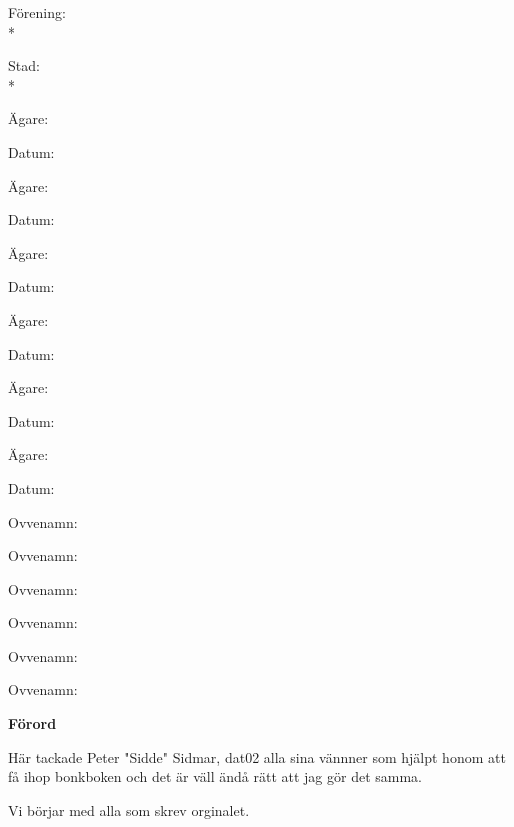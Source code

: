 \pagestyle{Inledning}


Förening: \hrulefill\\*%

Stad: \hrulefill\\*%



\begin{multicols}{2}
  Ägare: \hrulefill%

  Datum: \hrulefill%

  Ägare: \hrulefill%

  Datum: \hrulefill%

  Ägare: \hrulefill%

  Datum: \hrulefill%

  Ägare: \hrulefill%

  Datum: \hrulefill%

  Ägare: \hrulefill%

  Datum: \hrulefill%

  Ägare: \hrulefill%

  Datum: \hrulefill%
  
  \hfill

  Ovvenamn: \hrulefill%

  \hfill

  Ovvenamn: \hrulefill%

  \hfill

  Ovvenamn: \hrulefill%

  \hfill

  Ovvenamn: \hrulefill%

  \hfill

  Ovvenamn: \hrulefill%

  \hfill

  Ovvenamn: \hrulefill%

  \hfill
\end{multicols}



\newpage

\textbf{Förord}

Här tackade Peter "Sidde" Sidmar, dat02 alla sina vännner som hjälpt honom 
att få ihop bonkboken och det är väll ändå rätt att jag gör det samma.

Vi börjar med alla som skrev orginalet.

